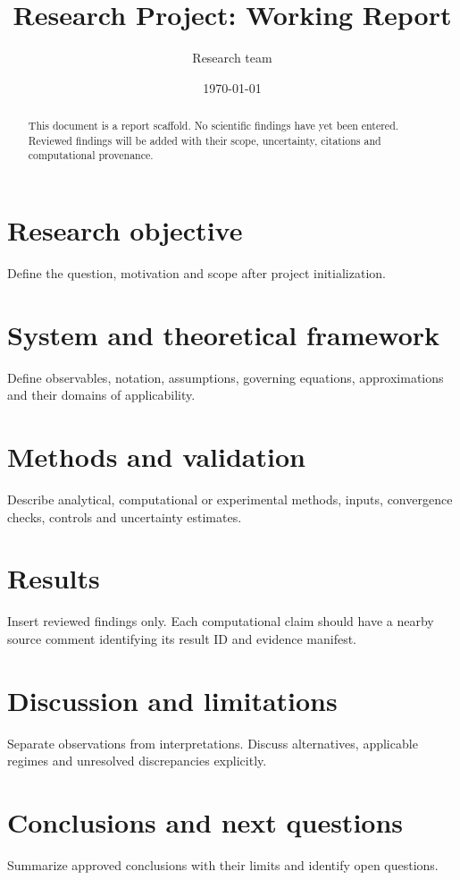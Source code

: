 \documentclass[11pt]{article}
\title{Research Project: Working Report}
\author{Research team}
\date{\today}
\begin{document}
\maketitle

\begin{abstract}
This document is a report scaffold. No scientific findings have yet been
entered. Reviewed findings will be added with their scope, uncertainty,
citations and computational provenance.
\end{abstract}

\section{Research objective}
Define the question, motivation and scope after project initialization.

\section{System and theoretical framework}
Define observables, notation, assumptions, governing equations,
approximations and their domains of applicability.

\section{Methods and validation}
Describe analytical, computational or experimental methods, inputs,
convergence checks, controls and uncertainty estimates.

\section{Results}
Insert reviewed findings only. Each computational claim should have a
nearby source comment identifying its result ID and evidence manifest.

\section{Discussion and limitations}
Separate observations from interpretations. Discuss alternatives,
applicable regimes and unresolved discrepancies explicitly.

\section{Conclusions and next questions}
Summarize approved conclusions with their limits and identify open questions.



\end{document}
